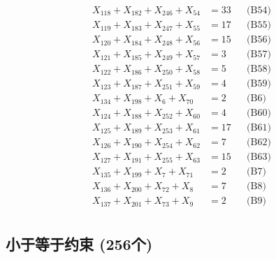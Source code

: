 \documentclass[a4paper,10pt]{article}
\begin{document}
{\begin{align}
X_{118} + X_{182} + X_{246} + X_{54} &= 33 && \text{(B54)} \\
X_{119} + X_{183} + X_{247} + X_{55} &= 17 && \text{(B55)} \\
X_{120} + X_{184} + X_{248} + X_{56} &= 15 && \text{(B56)} \\
X_{121} + X_{185} + X_{249} + X_{57} &= 3 && \text{(B57)} \\
X_{122} + X_{186} + X_{250} + X_{58} &= 5 && \text{(B58)} \\
X_{123} + X_{187} + X_{251} + X_{59} &= 4 && \text{(B59)} \\
\allowbreak
X_{134} + X_{198} + X_{6} + X_{70} &= 2 && \text{(B6)} \\
X_{124} + X_{188} + X_{252} + X_{60} &= 4 && \text{(B60)} \\
X_{125} + X_{189} + X_{253} + X_{61} &= 17 && \text{(B61)} \\
X_{126} + X_{190} + X_{254} + X_{62} &= 7 && \text{(B62)} \\
X_{127} + X_{191} + X_{255} + X_{63} &= 15 && \text{(B63)} \\
X_{135} + X_{199} + X_{7} + X_{71} &= 2 && \text{(B7)} \\
X_{136} + X_{200} + X_{72} + X_{8} &= 7 && \text{(B8)} \\
X_{137} + X_{201} + X_{73} + X_{9} &= 2 && \text{(B9)} \\
\end{align}}

\subsection{小于等于约束 (256个)}
\end{document}
